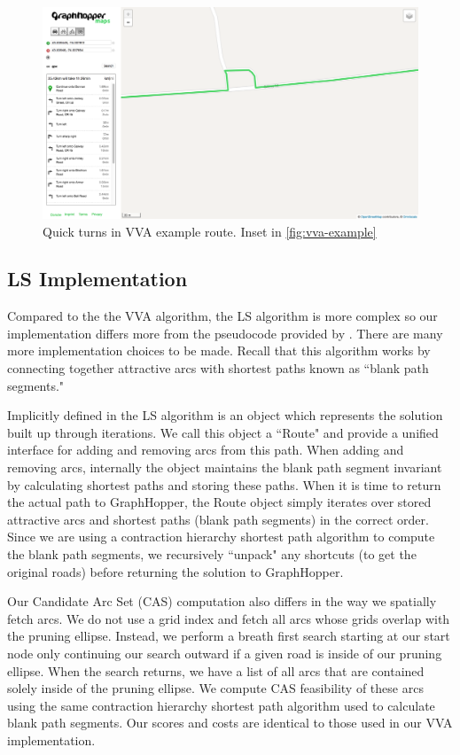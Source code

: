 \documentclass[honors]{union-cs-thesis}
\begin{document}
\begin{figure}
    \begin{center}
        \includegraphics[width=\textwidth]{figs/vva-route-turn}
    \end{center}
    \caption{Quick turns in VVA example route. Inset in \cref{fig:vva-example}}
    \label{fig:vva-example-turn}
\end{figure}


\subsection{LS Implementation}
Compared to the the VVA algorithm, the LS algorithm is more complex so our implementation differs more from the pseudocode provided by \citeauthor{lu2015arc}. There are many more implementation choices to be made. Recall that this algorithm works by connecting together attractive arcs with shortest paths known as ``blank path segments." 

Implicitly defined in the LS algorithm is an object which represents the solution built up through iterations. We call this object a ``Route" and provide a unified interface for adding and removing arcs from this path. When adding and removing arcs, internally the object maintains the blank path segment invariant by calculating shortest paths and storing these paths. When it is time to return the actual path to GraphHopper, the Route object simply iterates over stored attractive arcs and shortest paths (blank path segments) in the correct order. Since we are using a contraction hierarchy shortest path algorithm to compute the blank path segments, we recursively ``unpack" any shortcuts (to get the original roads) before returning the solution to GraphHopper. 

Our Candidate Arc Set (CAS) computation also differs in the way we spatially fetch arcs. We do not use a grid index and fetch all arcs whose grids overlap with the pruning ellipse.  Instead, we perform a breath first search starting at our start node only continuing our search outward if a given road is inside of our pruning ellipse. When the search returns, we have a list of all arcs that are contained solely inside of the pruning ellipse. We compute CAS feasibility of these arcs using the same contraction hierarchy shortest path algorithm used to calculate blank path segments. Our scores and costs are identical to those used in our VVA implementation.
\end{document}
